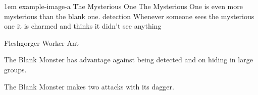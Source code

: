 \documentclass[letterpaper,openany,twoside,twocolumn]{book}
\begin{document}
\vfill\eject %

\MonsterVariant%
	{1em}%
	{example-image-a}%
	{The Mysterious One}%
	{%
		The Mysterious One is even more mysterious than the blank one.
		detection
		Whenever someone sees the mysterious one it is charmed and thinks it didn't see anything
	}%

\begin{DndMonster}[width=0.5\textwidth]{Fleshgorger Worker Ant}

    \DndMonsterBasics[
        armor-class = {10},
        hit-points  = {\DndDice{1d12 + 6}},
        speed       = {30 ft., climb 25 ft.},
    ]

    \DndMonsterAbilityScores[
    ]

    \DndMonsterDetails[
        challenge = 1,
    ]
    
    The Blank Monster has advantage against being detected and on hiding in large groups.
	
	The Blank Monster makes two attacks with its dagger.
	
	\DndMonsterAttack[
      name=Dagger,
      distance=melee, %
      mod=+3,
      reach=10,
      targets=one target,
      dmg=\DndDice{1d8 + 2},
      dmg-type=slashing,
    ]
      
\end{DndMonster}
\end{document}
